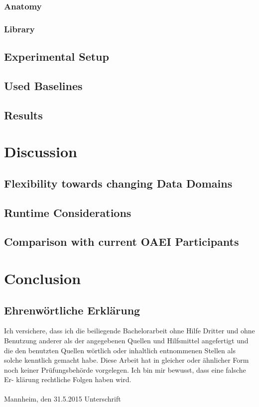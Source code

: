 \documentclass[11pt,titlepage,oneside,openany,a4paper]{report}
\begin{document}
\subsection{Anatomy}
\subsection{Library}
\section{Experimental Setup}
\section{Used Baselines}
\section{Results}



\chapter{Discussion}
\section{Flexibility towards changing Data Domains}
\section{Runtime Considerations}
\section{Comparison with current OAEI Participants}


\chapter{Conclusion}


\clearpage
\newpage







\newpage

\pagestyle{empty}


\section*{Ehrenw\"ortliche Erkl\"arung}
Ich versichere, dass ich die beiliegende Bachelorarbeit ohne Hilfe Dritter
und ohne Benutzung anderer als der angegebenen Quellen und Hilfsmittel
angefertigt und die den benutzten Quellen w\"ortlich oder inhaltlich
entnommenen Stellen als solche kenntlich gemacht habe. Diese Arbeit
hat in gleicher oder \"ahnlicher Form noch keiner Pr\"ufungsbeh\"orde
vorgelegen. Ich bin mir bewusst, dass eine falsche Er- kl\"arung rechtliche Folgen haben
wird.
\\
\\

\noindent
Mannheim, den 31.5.2015 \hspace{4cm} Unterschrift
\end{document}
